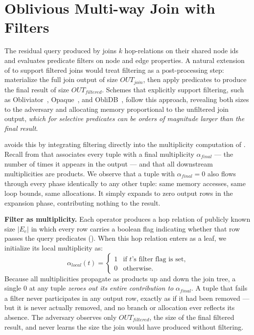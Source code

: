 \section{Oblivious Multi-way Join with Filters}
\label{sec:bandjoin}

The residual query produced by  joins $k$ hop-relations
on their shared node ids and evaluates predicate filters on node
and edge properties. A natural extension of \wei to support filtered joins would treat
filtering as a post-processing step: materialize the full join output of
size $\mathit{OUT}_{\mathit{join}}$, then apply predicates to produce the
final result of size $\mathit{OUT}_{\mathit{filtered}}$. Schemes that
explicitly support filtering, such as
Obliviator~\cite{mavrogiannakis2025obliviator}, Opaque~\cite{zheng2017opaque}, and
ObliDB~\cite{eskandarian2019oblidb}, follow this
approach, revealing both sizes to the adversary and allocating memory
proportional to the unfiltered join output, \textit{which for selective
predicates can be orders of magnitude larger than the final result}.


\system avoids this by integrating filtering directly into the
multiplicity computation of \wei. Recall from
 that \wei associates every tuple with a final
multiplicity $\alpha_{\mathit{final}}$ --- the number of times it appears
in the output --- and that all downstream multiplicities are products. We
observe that a
tuple with $\alpha_{\mathit{final}} = 0$ also flows through every phase
identically to any other tuple: same memory accesses, same loop bounds,
same allocations. It simply expands to zero output rows in the expansion
phase, contributing nothing to the result.

\noindent\textbf{Filter as multiplicity.}
Each \onehop operator produces a hop relation of publicly known size $|E_e|$ in
which every row carries a boolean flag indicating whether that row passes
the query predicates (). When this hop relation enters
\wei as a leaf, we initialize its local multiplicity as:
\[
\alpha_{\mathit{local}}(t) =
\begin{cases}
1 & \text{if } t\text{'s filter flag is set,} \\
0 & \text{otherwise.}
\end{cases}
\]
Because all multiplicities propagate as products up and down the join
tree, a single $0$ at any tuple \textit{zeroes out its entire contribution to}
$\alpha_{\mathit{final}}$. A tuple that fails a filter never participates
in any output row, exactly as if it had been removed --- but it is never
actually removed, and no branch or allocation ever reflects its absence.
The adversary observes only $\mathit{OUT}_{\mathit{filtered}}$, the size
of the final filtered result, and never learns the size the join would
have produced without filtering.

